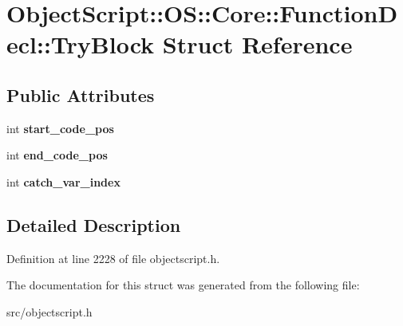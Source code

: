 \hypertarget{struct_object_script_1_1_o_s_1_1_core_1_1_function_decl_1_1_try_block}{}\section{Object\+Script\+:\+:OS\+:\+:Core\+:\+:Function\+Decl\+:\+:Try\+Block Struct Reference}
\label{struct_object_script_1_1_o_s_1_1_core_1_1_function_decl_1_1_try_block}
\subsection*{Public Attributes}
\begin{DoxyCompactItemize}
\item 
int {\bfseries start\+\_\+code\+\_\+pos}\hypertarget{struct_object_script_1_1_o_s_1_1_core_1_1_function_decl_1_1_try_block_a256897731ff7eba22502f5935f6299ed}{}\label{struct_object_script_1_1_o_s_1_1_core_1_1_function_decl_1_1_try_block_a256897731ff7eba22502f5935f6299ed}

\item 
int {\bfseries end\+\_\+code\+\_\+pos}\hypertarget{struct_object_script_1_1_o_s_1_1_core_1_1_function_decl_1_1_try_block_a3fb23acb3313d7524e34956af1d4722d}{}\label{struct_object_script_1_1_o_s_1_1_core_1_1_function_decl_1_1_try_block_a3fb23acb3313d7524e34956af1d4722d}

\item 
int {\bfseries catch\+\_\+var\+\_\+index}\hypertarget{struct_object_script_1_1_o_s_1_1_core_1_1_function_decl_1_1_try_block_a3d8bd8d03df9b0803b2a4f451b9eaa84}{}\label{struct_object_script_1_1_o_s_1_1_core_1_1_function_decl_1_1_try_block_a3d8bd8d03df9b0803b2a4f451b9eaa84}

\end{DoxyCompactItemize}


\subsection{Detailed Description}


Definition at line 2228 of file objectscript.\+h.



The documentation for this struct was generated from the following file\+:\begin{DoxyCompactItemize}
\item 
src/objectscript.\+h\end{DoxyCompactItemize}
